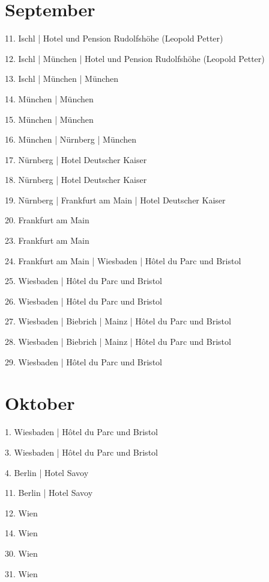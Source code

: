 \documentclass[twoside=false,titlepage=false,open=any, parskip=never, fontsize=10pt, headings=small, chapterprefix=false, appendixprefix=false, DIV=15]{scrbook}
\begin{document}
\begin{multicols}{3}
            \section*{September}
            11. Ischl | Hotel und Pension Rudolfshöhe (Leopold Petter)\par
            12. Ischl | München | Hotel und Pension Rudolfshöhe (Leopold Petter)\par
            13. Ischl | München | München\par
            14. München | München\par
            15. München | München\par
            16. München | Nürnberg | München\par
            17. Nürnberg | Hotel Deutscher Kaiser\par
            18. Nürnberg | Hotel Deutscher Kaiser\par
            19. Nürnberg | Frankfurt am Main | Hotel Deutscher Kaiser\par
            20. Frankfurt am Main\par
            23. Frankfurt am Main\par
            24. Frankfurt am Main | Wiesbaden | Hôtel du Parc und Bristol\par
            25. Wiesbaden | Hôtel du Parc und Bristol\par
            26. Wiesbaden | Hôtel du Parc und Bristol\par
            27. Wiesbaden | Biebrich | Mainz | Hôtel du Parc und Bristol\par
            28. Wiesbaden | Biebrich | Mainz | Hôtel du Parc und Bristol\par
            29. Wiesbaden | Hôtel du Parc und Bristol\par
            \section*{Oktober}
            1. Wiesbaden | Hôtel du Parc und Bristol\par
            3. Wiesbaden | Hôtel du Parc und Bristol\par
            4. Berlin | Hotel Savoy\par
            11. Berlin | Hotel Savoy\par
            12. Wien\par
            14. Wien\par
            30. Wien\par
            31. Wien\par

\end{multicols}
\end{document}
